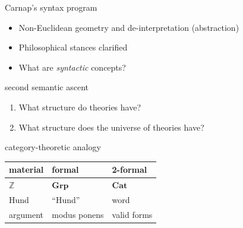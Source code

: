 \documentclass[17pt]{beamer}
\begin{document}
\begin{frame}{\small Carnap's syntax program}

\begin{itemize}
\item Non-Euclidean geometry and de-interpretation (abstraction)

\item Philosophical stances clarified


\item What are \emph{syntactic} concepts?
  
\end{itemize}

\end{frame}

\begin{frame}{\small second semantic ascent}

\begin{enumerate}
\item What structure do theories have?
\item What structure does the universe of theories have?
\end{enumerate}

\end{frame}


\begin{frame}{\small category-theoretic analogy}

  \begin{tabular}{| l | l | l |}
    \hline 
material & formal & 2-formal \\ \hline \hline    
$\mathbb{Z}$ & $\mathbf{Grp}$ & $\mathbf{Cat}$ \\ \hline
  Hund & ``Hund'' &  word  \\ \hline
argument & modus ponens & valid forms \\ \hline \end{tabular}

\end{frame}
\end{document}
